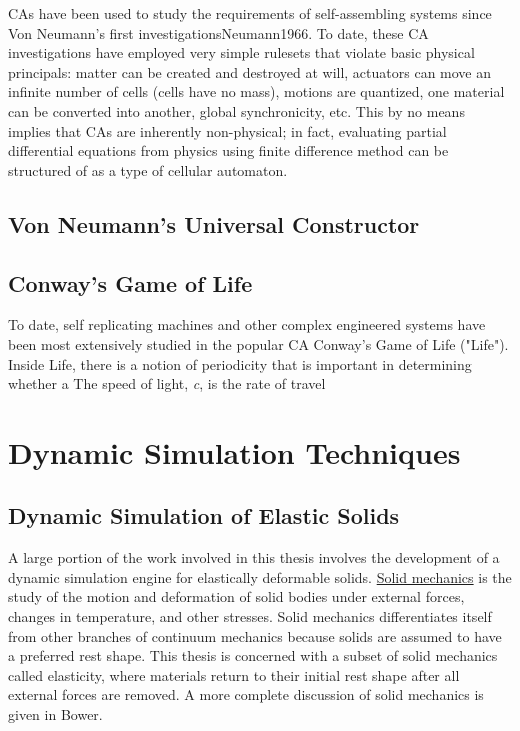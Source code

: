 {CAs have been used to study the requirements of self-assembling systems since Von Neumann's first investigations{Neumann1966}.  To date, these CA investigations have employed very simple rulesets that violate basic physical principals: matter can be created and destroyed at will, actuators can move an infinite number of cells (cells have no mass), motions are quantized, one material can be converted into another, global synchronicity, etc.  This by no means implies that CAs are inherently non-physical; in fact, evaluating partial differential equations from physics using finite difference method can be structured of as a type of cellular automaton\cite{Yang2010}.

\subsection{Von Neumann's Universal Constructor}



\subsection{Conway's Game of Life}

To date, self replicating machines and other complex engineered systems have been most extensively studied in the popular CA Conway's Game of Life ("Life").\\

Inside Life, there is a notion of periodicity that is important in determining whether a 
The speed of light, \textit{c}, is the rate of travel 

\section{Dynamic Simulation Techniques}

\subsection{Dynamic Simulation of Elastic Solids}

A large portion of the work involved in this thesis involves the development of a dynamic simulation engine for elastically deformable solids.  \href{https://en.wikipedia.org/wiki/Solid_mechanics}{Solid mechanics} is the study of the motion and deformation of solid bodies under external forces, changes in temperature, and other stresses.  Solid mechanics differentiates itself from other branches of continuum mechanics because solids are assumed to have a preferred rest shape.  This thesis is concerned with a subset of solid mechanics called elasticity, where materials return to their initial rest shape after all external forces are removed.  A more complete discussion of solid mechanics is given in Bower\cite{Bower2009}.\\  

}

